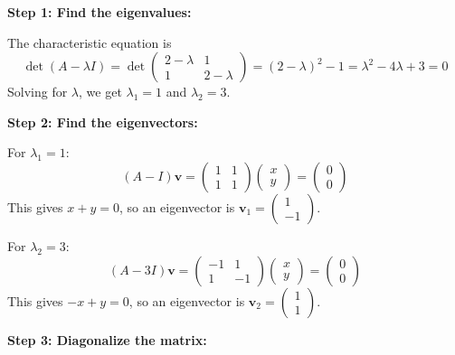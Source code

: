 \textbf{Step 1: Find the eigenvalues:}

The characteristic equation is
    \[
    \det(A - \lambda I) = \det \begin{pmatrix}
    2 - \lambda & 1 \\
    1 & 2 - \lambda
    \end{pmatrix} = (2 - \lambda)^2 - 1 = \lambda^2 - 4\lambda + 3 = 0
    \]
    Solving for \(\lambda\), we get \(\lambda_1 = 1\) and \(\lambda_2 = 3\).

\textbf{Step 2: Find the eigenvectors:}

For \(\lambda_1 = 1\):
    \[
    (A - I)\mathbf{v} = \begin{pmatrix}
    1 & 1 \\
    1 & 1
    \end{pmatrix} \begin{pmatrix}
    x \\
    y
    \end{pmatrix} = \begin{pmatrix}
    0 \\
    0
    \end{pmatrix}
    \]
    This gives \(x + y = 0\), so an eigenvector is \(\mathbf{v}_1 = \begin{pmatrix} 1 \\ -1 \end{pmatrix}\).

    For \(\lambda_2 = 3\):
    \[
    (A - 3I)\mathbf{v} = \begin{pmatrix}
    -1 & 1 \\
    1 & -1
    \end{pmatrix} \begin{pmatrix}
    x \\
    y
    \end{pmatrix} = \begin{pmatrix}
    0 \\
    0
    \end{pmatrix}
    \]
    This gives \(-x + y = 0\), so an eigenvector is \(\mathbf{v}_2 = \begin{pmatrix} 1 \\ 1 \end{pmatrix}\).

\textbf{Step 3: Diagonalize the matrix:}

